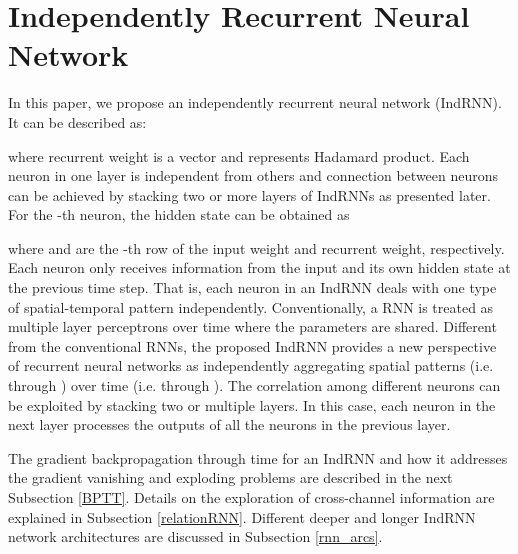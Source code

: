 \documentclass[10pt,twocolumn,letterpaper]{article}
\begin{document}
\section{Independently Recurrent Neural Network}
In this paper, we propose an independently recurrent neural network (IndRNN). It can be described as:

where recurrent weight  is a vector and  represents Hadamard product. Each neuron in one layer is independent from others and connection between neurons can be achieved by stacking two or more layers of IndRNNs as presented later. For the -th neuron, the hidden state  can be obtained as 

where  and  are the -th row of the input weight and recurrent weight, respectively. Each neuron only receives information from the input and its own hidden state at the previous time step. That is, each neuron in an IndRNN deals with one type of spatial-temporal pattern independently. Conventionally, a RNN is treated as multiple layer perceptrons over time where the parameters are shared. Different from the conventional RNNs, the proposed IndRNN provides a new perspective of recurrent neural networks as independently aggregating spatial patterns (i.e. through ) over time (i.e. through ). The correlation among different neurons can be exploited by stacking two or multiple layers. In this case, each neuron in the next layer processes the outputs of all the neurons in the previous layer.

The gradient backpropagation through time for an IndRNN and how it addresses the gradient vanishing and exploding problems are described in the next Subsection \ref{BPTT}. Details on the exploration of cross-channel information are explained in Subsection \ref{relationRNN}. Different deeper and longer IndRNN network architectures are discussed in Subsection \ref{rnn_arcs}.


\vspace{0.3cm}
\end{document}
